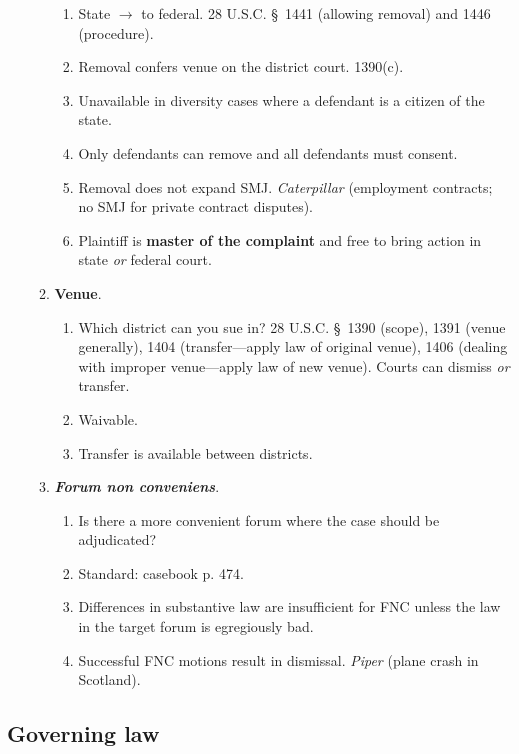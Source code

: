 \begin{enumerate}
\begin{enumerate}
\begin{enumerate}
            \item State $\rightarrow$ to federal. 28 U.S.C. \S\ 1441 (allowing 
            removal) and 1446 (procedure).
            \item Removal confers venue on the district court. 1390(c).
            \item Unavailable in diversity cases where a defendant is a 
            citizen of the state.
            \item Only defendants can remove and all defendants must consent.
            \item Removal does not expand SMJ. \emph{Caterpillar} (employment 
            contracts; no SMJ for private contract disputes).
            \item Plaintiff is \textbf{master of the complaint} and free to 
            bring action in state \emph{or} federal court.
        \end{enumerate}
        \item \textbf{Venue}.
        \begin{enumerate}
            \item Which district can you sue in? 28 U.S.C. \S\ 1390 (scope), 
            1391 (venue generally), 1404 (transfer---apply law of original 
            venue), 1406 (dealing with improper venue---apply law of new 
            venue). Courts can dismiss \emph{or} transfer.
            \item Waivable.
            \item Transfer is available between districts.
        \end{enumerate}
        \item \textbf{\emph{Forum non conveniens}}.
        \begin{enumerate}
            \item Is there a more convenient forum where the case should be 
            adjudicated?
            \item Standard: casebook p. 474.
            \item Differences in substantive law are insufficient for FNC 
            unless the law in the target forum is egregiously bad.
            \item Successful FNC motions result in dismissal. \emph{Piper} 
            (plane crash in Scotland).
        \end{enumerate}
    \end{enumerate}
\end{enumerate}

\subsection{Governing law}

